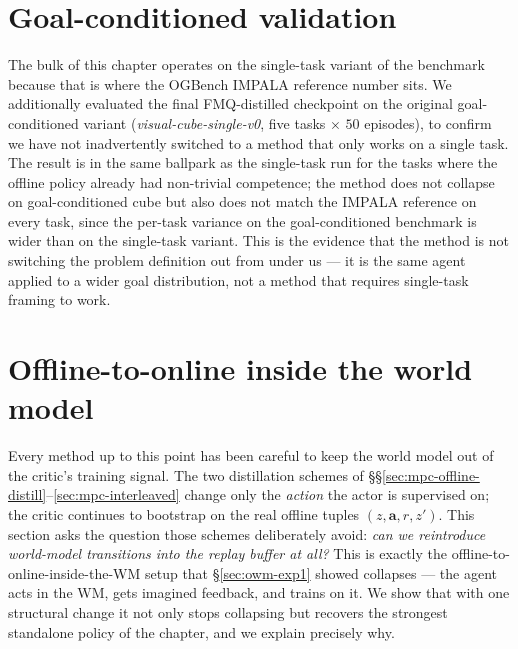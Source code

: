 \section{Goal-conditioned validation}
\label{sec:owm-gc-validation}

The bulk of this chapter operates on the single-task variant of the
benchmark because that is where the OGBench IMPALA reference number
sits. We additionally evaluated the final FMQ-distilled checkpoint on
the original goal-conditioned variant (\emph{visual-cube-single-v0},
five tasks $\times$ $50$ episodes), to confirm we have not
inadvertently switched to a method that only works on a single task.
The result is in the same ballpark as the single-task run for the
tasks where the offline policy already had non-trivial competence; the
method does not collapse on goal-conditioned cube but also does not
match the IMPALA reference on every task, since the per-task variance
on the goal-conditioned benchmark is wider than on the single-task
variant. This is the evidence that the method is not switching the
problem definition out from under us --- it is the same agent applied
to a wider goal distribution, not a method that requires single-task
framing to work.

\section{Offline-to-online inside the world model}
\label{sec:mpc-online-wm}

Every method up to this point has been careful to keep the world model
out of the critic's training signal. The two distillation schemes of
\S\S\ref{sec:mpc-offline-distill}--\ref{sec:mpc-interleaved} change only
the \emph{action} the actor is supervised on; the critic continues to
bootstrap on the real offline tuples $(z, \mathbf{a}, r, z')$. This
section asks the question those schemes deliberately avoid: \emph{can we
reintroduce world-model transitions into the replay buffer at all?} This
is exactly the offline-to-online-inside-the-WM setup that
\S\ref{sec:owm-exp1} showed collapses --- the agent acts in the WM, gets
imagined feedback, and trains on it. We show that with one structural
change it not only stops collapsing but recovers the strongest
standalone policy of the chapter, and we explain precisely why.


